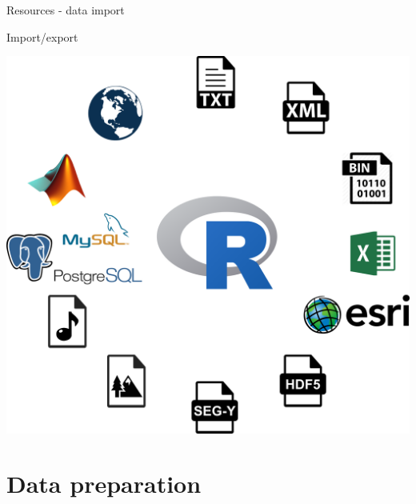 \documentclass[8pt,ignorenonframetext,]{beamer}
\begin{document}
\begin{frame}[fragile]{Resources - data import}
\end{frame}

\begin{frame}{Import/export}

\includegraphics{imgPres/input.png}

\end{frame}

\section{Data preparation}\label{data-preparation}
\end{document}
